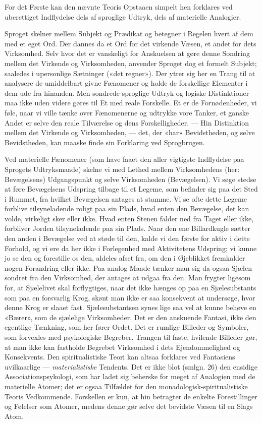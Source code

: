 \documentclass[12pt,a4paper,openany]{book}
\newcommand{\opage}[1]{\marginnote{\footnotesize\textit{[#1]}}}
\begin{document}
For det Første kan den nævnte Teoris Opstaaen simpelt hen forklares ved
uberettiget Indflydelse dels af sproglige Udtryk, dels af materielle Analogier.

Sproget skelner mellem Subjekt og Prædikat og betegner i Regelen hvert af dem
med et eget Ord. Der dannes da et Ord for det virkende Væsen, et andet for dets
Virksomhed. Selv hvor det er vanskeligt for Anskuelsen at gøre denne Sondring
mellem det Virkende og Virksomheden, anvender Sproget dog et formelt Subjekt;
saaledes i upersonlige Sætninger («det regner»). Der ytrer sig her en Trang til
at analysere de umiddelbart givne Fænomener og holde de forskellige Elementer i
dem ude fra hinanden. Men sondrede sproglige Udtryk og logiske Distinktioner
maa ikke uden videre gøres til Et med reale Forskelle. Et er de Fornødenheder,
vi føle, naar vi ville tænke over Fænomenerne og
\setcounter{footnote}{0}%
\opage{79}udtrykke vore Tanker, et ganske Andet er selve den reale Tilværelse
og dens Forskelligheder. --- Hin Distinktion mellem det Virkende og
Virksomheden, --- det, der «har» Bevidstheden, og selve Bevidstheden, kan
maaske finde sin Forklaring ved Sprogbrugen.

Ved materielle Fænomener (som have faaet den aller vigtigste Indflydelse paa
Sprogets Udtryksmaade) skelne vi med Lethed mellem Virksomhedens (her:
Bevægelsens) Udgangspunkt og selve Virksomheden (Bevægelsen). Vi søge stedse at
føre Bevægelsens Udspring tilbage til et Legeme, som befinder sig paa det Sted
i Rummet, fra hvilket Bevægelsen antages at stamme. Vi se ofte dette Legeme
forblive tilsyneladende roligt paa sin Plads, hvad enten den Bevægelse, det kan
volde, virkeligt sker eller ikke. Hvad enten Stenen falder ned fra Taget eller
ikke, forbliver Jorden tilsyneladende paa sin Plads. Naar den ene Billardkugle
sætter den anden i Bevægelse ved at støde til den, kalde vi den første for
aktiv i dette Forhold, og vi ere da her ikke i Forlegenhed med Aktivitetens
Udspring; vi kunne jo se den og forestille os den, aldeles afset fra, om den i
Øjeblikket fremkalder nogen Forandring eller ikke. Paa analog Maade tænker man
sig da ogsaa Sjælen sondret fra den Virksomhed, der antages at udgaa fra den.
Man frygter ligesom for, at Sjælelivet skal forflygtiges, naar det ikke hænges
op paa en Sjælesubstants som paa en forsvarlig Krog, skønt man ikke er saa
konsekvent at undersøge, hvor denne Krog er slaaet fast. Sjælesubstantsen synes
lige saa vel at kunne behøve en «Bærer», som de sjælelige Virksomheder. Det er
den anskuende Fantasi, ikke den egentlige Tænkning, som her fører Ordet. Det er
rumlige Billeder og Symboler, som forvexles med psykologiske Begreber. Trangen
til faste, hvilende Billeder gør, at man ikke kan fastholde Begrebet Virksomhed
i dets Ejendommelighed og Konsekvents. Den spiritualistiske Teori kan altsaa
forklares ved Fantasiens uvilkaarlige --- \emph{materialistiske} Tendents. Det
er ikke blot (smlgn. 26) den ensidige Associationspsykologi, som har ladet sig
beherske for meget af Analogien med de materielle Atomer; det er ogsaa
Tilfældet for den monadologisk-spiritualistiske Teoris Vedkommende. Forskellen
er kun, at hin betragter de enkelte Forestillinger og Følelser som Atomer,
medens denne gør selve det bevidste Væsen til en Slags Atom.
\end{document}
